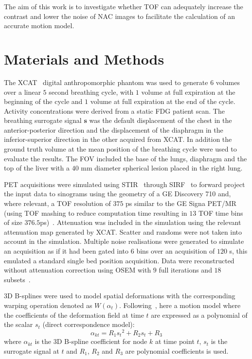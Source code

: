 \documentclass[journal]{IEEEtran}
\begin{document}
The aim of this work is to investigate whether TOF can adequately increase the contrast and lower the noise of NAC images to facilitate the calculation of an accurate motion model.

\section{Materials and Methods}
The XCAT~\cite{Segars2010} digital anthropomorphic phantom was used to generate $6$ volumes over a linear $5$ second breathing cycle, with $1$ volume at full expiration at the beginning of the cycle and $1$ volume at full expiration at the end of the cycle. Activity concentrations were derived from a static FDG patient scan. The breathing surrogate signal $\bm{s}$ was the default displacement of the chest in the anterior-posterior direction and the displacement of the diaphragm in the inferior-superior direction in the other acquired from XCAT. In addition the ground truth volume at the mean position of the breathing cycle were used to evaluate the results. The FOV included the base of the lungs, diaphragm and the top of the liver with a $40$ mm diameter spherical lesion placed in the right lung.

PET acquisitions were simulated using STIR~\cite{Thielemans2012} through SIRF~\cite{Ovtchinnikov2017} to forward project the input data to sinograms using the geometry of a GE Discovery 710 and, where relevant, a TOF resolution of $375$ ps similar to the GE Signa PET/MR (using TOF mashing to reduce computation time resulting in $13$ TOF time bins of size $376.5$ps)~\cite{Efthimiou2018}. Attenuation was included in the simulation using the relevant attenuation map generated by XCAT. Scatter and randoms were not taken into account in the simulation. Multiple noise realisations were generated to simulate an acquisition as if it had been gated into $6$ bins over an acquisition of $120$ s, this emulated a standard single bed position acquisition. Data were reconstructed without attenuation correction using OSEM with $9$ full iterations and $18$ subsets~\cite{Hudson1994}. 

3D B-splines were used to model spatial deformations with the corresponding warping operation denoted as $W(\alpha_t)$. Following~\cite{McClelland2013}, here a motion model where the coefficients of the deformation field at time $t$ are expressed as a polynomial of the scalar $s_t$ (direct correspondence model):
\begin{equation}
    \alpha_{kt} = R_1 {s_t}^2 + R_2 s_t + R_3
\end{equation}
\noindent where $\alpha_{kt}$ is the 3D B-spline coefficient for node $k$ at time point $t$, $s_t$ is the surrogate signal at $t$ and $R_1$, $R_2$ and $R_3$ are polynomial coefficients is used. 
\end{document}
